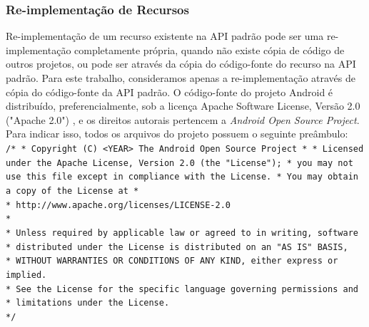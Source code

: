 \subsubsection{Re-implementação de Recursos}

Re-implementação de um recurso existente na API padrão pode ser uma re-implementação
completamente própria, quando não existe cópia de código de outros projetos, ou pode
ser através da cópia do código-fonte do recurso na API padrão. Para este trabalho,
consideramos apenas a re-implementação através de cópia do código-fonte da API padrão.
O código-fonte do projeto Android é distribuído, preferencialmente, sob a licença Apache 
Software License, Versão 2.0 ("Apache 2.0") \cite{License}, e os direitos autorais
pertencem a \textit{Android Open Source Project}. Para indicar isso, todos os arquivos
do projeto possuem o seguinte preâmbulo:
\texttt{
\newline
/* \newline
 * Copyright (C) <YEAR> The Android Open Source Project \newline
 * \newline
 * Licensed under the Apache License, Version 2.0 (the "License"); \newline
 * you may not use this file except in compliance with the License. \newline
 * You may obtain a copy of the License at \newline
 * \\
 *      http://www.apache.org/licenses/LICENSE-2.0 \\
 * \\
 * Unless required by applicable law or agreed to in writing, software \\
 * distributed under the License is distributed on an "AS IS" BASIS, \\
 * WITHOUT WARRANTIES OR CONDITIONS OF ANY KIND, either express or implied. \\
 * See the License for the specific language governing permissions and \\
 * limitations under the License. \\
 */
} 

